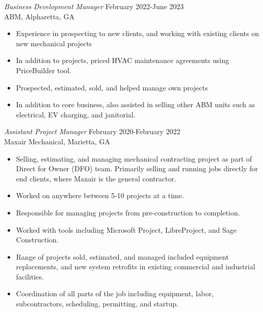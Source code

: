 \documentclass[margin]{res}
\begin{document}
\begin{resume}
    {\sl Business Development Manager} \hfill February 2022-June 2023 \\
            ABM, Alpharetta, GA
       \begin{itemize}  \itemsep -2pt
            \item Experience in prospecting to new clients, and working with existing clients on new mechanical projects
            \item In addition to projects, priced HVAC maintenance agreements using PriceBuilder tool.
            \item Prospected, estimated, sold, and helped manage own projects
            \item In addition to core business, also assisted in selling other ABM units such as electrical, EV charging, and janitorial.  
            \end{itemize}
            
    {\sl Assistant Project Manager} \hfill February 2020-February 2022 \\
 	    Maxair Mechanical, Marietta, GA
        \begin{itemize}  \itemsep -2pt %
            \item Selling, estimating, and managing mechanical contracting project as part of Direct for Owner (DFO) team. Primarily selling and running jobs directly for end clients, where Maxair is the general contractor.
            \item Worked on anywhere between 5-10 projects at a time.
            \item Responsible for managing projects from pre-construction to completion.
            \item Worked with tools including Microsoft Project, LibreProject, and Sage Construction.
            \item Range of projects sold, estimated, and managed included equipment replacements, and new system retrofits in existing commercial and industrial facilities.
            \item Coordination of all parts of the job including equipment, labor, subcontractors, scheduling, permitting, and startup.
            \end{itemize}


\end{resume}
\end{document}
